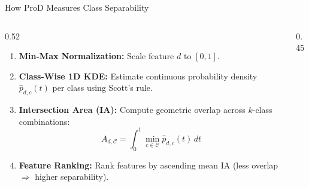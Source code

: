 \documentclass[aspectratio=169, 11pt]{beamer}
\begin{document}
\begin{frame}{How ProD Measures Class Separability}
  \begin{columns}[c]
    \begin{column}{0.52\textwidth}
      \begin{enumerate}
        \item \textbf{Min-Max Normalization:} Scale feature $d$ to $[0, 1]$.
        \item \textbf{Class-Wise 1D KDE:} Estimate continuous probability density $\hat{p}_{d,c}(t)$ per class using Scott's rule.
        \item \textbf{Intersection Area (IA):} Compute geometric overlap across $k$-class combinations:
        \[
          A_{d, \mathcal{C}} = \int_0^1 \min_{c \in \mathcal{C}} \hat{p}_{d,c}(t) \, dt
        \]
        \item \textbf{Feature Ranking:} Rank features by ascending mean IA (less overlap $\Rightarrow$ higher separability).
      \end{enumerate}
    \end{column}
    \begin{column}{0.45\textwidth}
      \centering
    \end{column}
  \end{columns}
\end{frame}

\end{document}
